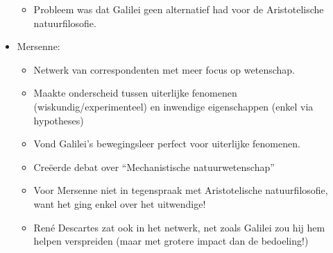 \documentclass{article}
\begin{document}
\begin{itemize}
\begin{itemize}
        \item Probleem was dat Galilei geen alternatief had voor de Aristotelische natuurfilosofie.
      \end{itemize}
      \item Mersenne:
      \begin{itemize}
        \item Netwerk van correspondenten met meer focus op wetenschap.
        \item Maakte onderscheid tussen uiterlijke fenomenen (wiskundig/experimenteel) en inwendige eigenschappen (enkel via hypotheses)
        \item Vond Galilei's bewegingsleer perfect voor uiterlijke fenomenen.
        \item Cre\"eerde debat over ``Mechanistische natuurwetenschap''
        \item Voor Mersenne niet in tegenspraak met Aristotelische natuurfilosofie, want het ging enkel over het uitwendige!
        \item Ren\'e Descartes zat ook in het netwerk, net zoals Galilei zou hij hem helpen verspreiden (maar met grotere impact dan de bedoeling!)
      \end{itemize}
    \end{itemize}

  \newpage
\end{document}

